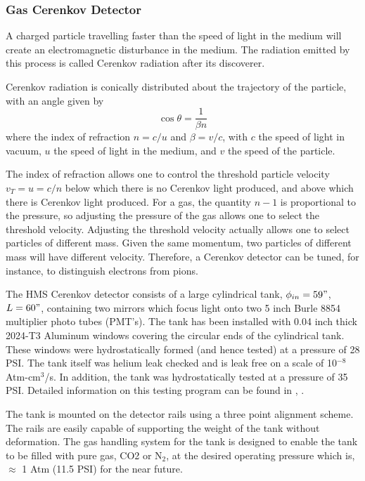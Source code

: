 \subsubsection{Gas Cerenkov Detector}

A charged particle travelling faster
than the speed of light in the medium will create an electromagnetic
disturbance in the medium. The radiation emitted by this process is
called Cerenkov radiation after its discoverer.

Cerenkov radiation is conically distributed about the trajectory of the
particle, with an angle given by
$$
	\cos{\theta} = \frac{1}{\beta n}
$$
where the index of refraction $n = c/u$ and $\beta = v/c$, with $c$
the speed of light in vacuum, $u$ the speed of light in the medium,
and $v$ the speed of the particle.

The index of refraction allows one to control the threshold particle velocity 
$v_{T}=u=c/n$ below which there is no Cerenkov light produced, and above which there 
is Cerenkov light produced.  For a gas, the quantity $n-1$ is proportional to the pressure, 
so adjusting the pressure of the gas allows one to select the
threshold velocity. Adjusting the threshold velocity actually allows one to select particles of
different mass.  Given the same momentum, two particles of different mass
will have different velocity.  Therefore, a Cerenkov detector can be tuned,
for instance, to distinguish electrons from pions.

	The HMS Cerenkov detector consists of a large cylindrical
tank, $\phi_{in} = 59"$, $L = 60"$, containing two mirrors which focus
light onto two 5 inch Burle 8854 multiplier photo  tubes (PMT's). The tank
has been installed with 0.04 inch thick 2024-T3 Aluminum windows
covering the circular ends of the cylindrical tank. These
windows were hydrostatically formed (and hence tested) at a pressure
of 28 PSI. The tank itself was helium leak checked and is leak free
on a scale of 10$^{-8}$ Atm-cm$^3$/s. In addition, the tank was hydrostatically
tested at a pressure of 35 PSI. Detailed information on this testing
program can be found in \cite {bi:tank}, \cite {bi:wind}.

The tank is mounted on the detector rails using a three point
alignment scheme. The rails are easily capable of supporting the
weight of the tank without deformation.  
The gas handling system for the tank
is designed to enable the tank to be filled with
pure gas, CO2 or N$_2$, at the desired operating
pressure which is, $\approx$ 1 Atm (11.5 PSI) for the near future.

